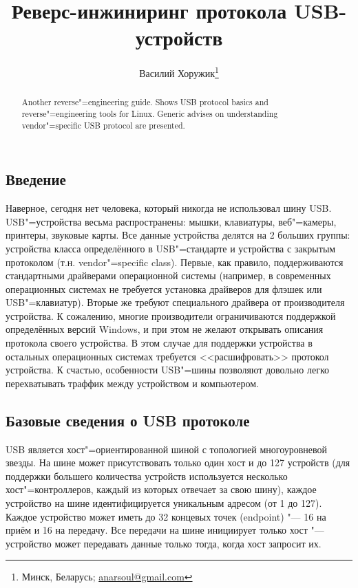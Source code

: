 \documentclass[10pt, a5paper]{article}
\begin{document}
\title{Реверс-инжиниринг протокола USB-устройств}%

\author{Василий Хоружик\footnote{Минск, Беларусь; \url{anarsoul@gmail.com}}}
\maketitle

\begin{abstract}
Another reverse"=engineering guide. Shows USB protocol basics and reverse"=engineering tools for Linux. Generic advises on understanding vendor"=specific USB protocol are presented. 
\end{abstract}

\subsection*{Введение}

Наверное, сегодня нет человека, который никогда не использовал шину USB. USB"=устройства весьма распространены: мышки, клавиатуры, веб"=камеры, принтеры, звуковые карты. Все данные устройства делятся на 2 больших группы: устройства класса определённого в USB"=стандарте и устройства с закрытым протоколом (т.н. vendor"=specific class). Первые, как правило, поддерживаются стандартными драйверами операционной системы (например, в современных операционных системах не требуется установка драйверов для флэшек или USB"=клавиатур). Вторые же требуют специального драйвера от производителя устройства. К сожалению, многие производители ограничиваются поддержкой определённых версий Windows, и при этом не желают открывать описания протокола своего устройства. В этом случае для поддержки устройства в остальных операционных системах требуется <<расшифровать>> протокол устройства. К счастью, особенности USB"=шины позволяют довольно легко перехватывать траффик между устройством и компьютером.

\subsection*{Базовые сведения о USB протоколе}

USB является хост"=ориентированной шиной с топологией многоуровневой звезды. На шине может присутствовать только один хост и до 127 устройств (для поддержки большего количества устройств используется несколько хост"=контроллеров, каждый из которых отвечает за свою шину), каждое устройство на шине идентифицируется уникальным адресом (от 1 до 127). Каждое устройство может иметь до 32 концевых точек (endpoint) "--- 16 на приём и 16 на передачу. Все передачи на шине инициирует только хост "--- устройство может передавать данные только тогда, когда хост запросит их.
\end{document}
